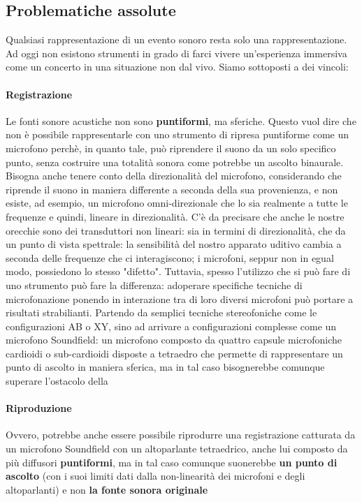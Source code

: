 	\subsection{Problematiche assolute}
	Qualsiasi rappresentazione di un evento sonoro resta solo una rappresentazione. Ad oggi non esistono strumenti in grado di farci vivere un'esperienza immersiva come un concerto in una situazione non dal vivo. Siamo sottoposti a dei vincoli:
	
	\paragraph{Registrazione} Le fonti sonore acustiche non sono \textbf{puntiformi}, ma sferiche. Questo vuol dire che non è possibile rappresentarle con uno strumento di ripresa puntiforme come un microfono perchè, in quanto tale, può riprendere il suono da un solo specifico punto, senza costruire una totalità sonora come potrebbe un ascolto binaurale. Bisogna anche tenere conto della direzionalità del microfono, considerando che riprende il suono in maniera differente a seconda della sua provenienza, e non esiste, ad esempio, un microfono omni-direzionale che lo sia realmente a tutte le frequenze e quindi, lineare in direzionalità. C'è da precisare che anche le nostre orecchie sono dei transduttori non lineari: sia in termini di direzionalità, che da un punto di vista spettrale: la sensibilità del nostro apparato uditivo cambia a seconda delle frequenze che ci interagiscono; i microfoni, seppur non in egual modo, possiedono lo stesso "difetto".
	Tuttavia, spesso l'utilizzo che si può fare di uno strumento può fare la differenza: adoperare specifiche tecniche di microfonazione ponendo in interazione tra di loro diversi microfoni può portare a risultati strabilianti. Partendo da semplici tecniche stereofoniche come  le configurazioni AB o XY, sino ad arrivare a configurazioni complesse come un microfono Soundfield: un microfono composto da quattro capsule microfoniche cardioidi o sub-cardioidi disposte a tetraedro che permette di rappresentare un punto di ascolto in maniera sferica, ma in tal caso bisognerebbe comunque superare l'ostacolo della
	
	\paragraph{Riproduzione} Ovvero, potrebbe anche essere possibile riprodurre una registrazione catturata da un microfono Soundfield con un altoparlante tetraedrico, anche lui composto da più diffusori \textbf{puntiformi}, ma in tal caso comunque suonerebbe \textbf{un punto di ascolto} (con i suoi limiti dati dalla non-linearità dei microfoni e degli altoparlanti) e non \textbf{la fonte sonora originale}
	
